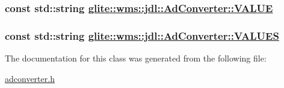 \hypertarget{classglite_1_1wms_1_1jdl_1_1AdConverter_s1}{
\subsubsection[VALUE]{\setlength{\rightskip}{0pt plus 5cm}const std::string \hyperlink{classglite_1_1wms_1_1jdl_1_1AdConverter_s1}{glite::wms::jdl::Ad\-Converter::VALUE}}}
\label{classglite_1_1wms_1_1jdl_1_1AdConverter_s1}


\hypertarget{classglite_1_1wms_1_1jdl_1_1AdConverter_s0}{
\subsubsection[VALUES]{\setlength{\rightskip}{0pt plus 5cm}const std::string \hyperlink{classglite_1_1wms_1_1jdl_1_1AdConverter_s0}{glite::wms::jdl::Ad\-Converter::VALUES}}}
\label{classglite_1_1wms_1_1jdl_1_1AdConverter_s0}




The documentation for this class was generated from the following file:\begin{CompactItemize}
\item 
\hyperlink{adconverter_8h}{adconverter.h}\end{CompactItemize}
